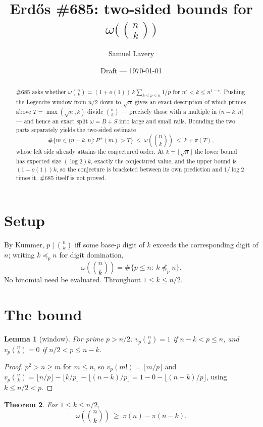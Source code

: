 \documentclass[11pt]{article}
\title{Erd\H{o}s \#685: two-sided bounds for
$\omega\bigl(\binom nk\bigr)$}
\author{Samuel Lavery}
\date{Draft --- \today}
\newtheorem{theorem}{Theorem}
\newtheorem{lemma}[theorem]{Lemma}
\begin{document}
\maketitle

\begin{abstract}
\#685 asks whether $\omega\binom nk=(1+o(1))\,k\sum_{k<p<n}1/p$ for
$n^{\varepsilon}<k\le n^{1-\varepsilon}$.  Pushing the Legendre window from $n/2$ down to
$\sqrt n$ gives an exact description of which primes above $T=\max(\sqrt n,k)$ divide
$\binom nk$ --- precisely those with a multiple in $(n-k,n]$ --- and hence an exact split
$\omega=B+S$ into large and small rails.  Bounding the two parts separately yields the
two-sided estimate
\[
  \#\bigl\{m\in(n-k,n]:P^{+}(m)>T\bigr\}\ \le\ \omega\!\left(\binom nk\right)\ \le\ k+\pi(T),
\]
whose left side already attains the conjectured order.  At $k=\lfloor\sqrt n\rfloor$ the
lower bound has expected size $(\log2)k$, exactly the conjectured value, and the upper bound
is $(1+o(1))k$, so the conjecture is bracketed between its own prediction and $1/\log2$
times it.  \#685 itself is not proved.
\end{abstract}

\section{Setup}
By Kummer, $p\mid\binom nk$ iff some base-$p$ digit of $k$ exceeds the corresponding digit of
$n$; writing $k\preceq_p n$ for digit domination,
\[
  \omega\!\left(\binom nk\right)=\#\{p\le n:\ k\not\preceq_p n\}.
\]
No binomial need be evaluated.  Throughout $1\le k\le n/2$.

\section{The bound}

\begin{lemma}[window]\label{lem:window}
For prime $p>n/2$: $v_p\binom nk=1$ if $n-k<p\le n$, and $v_p\binom nk=0$ if $n/2<p\le n-k$.
\end{lemma}

\begin{proof}
$p^2>n\ge m$ for $m\le n$, so $v_p(m!)=\lfloor m/p\rfloor$ and
$v_p\binom nk=\lfloor n/p\rfloor-\lfloor k/p\rfloor-\lfloor(n-k)/p\rfloor
=1-0-\lfloor(n-k)/p\rfloor$, using $k\le n/2<p$.
\end{proof}

\begin{theorem}\label{thm:685}
For $1\le k\le n/2$,
\[
  \omega\!\left(\binom nk\right)\ \ge\ \pi(n)-\pi(n-k).
\]
\end{theorem}
\end{document}
